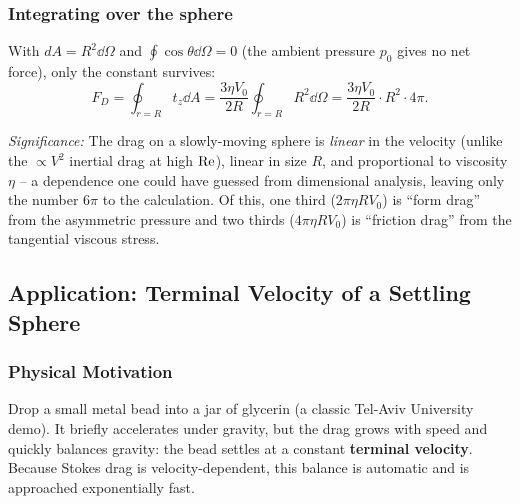 \documentclass[../main.tex]{subfiles}
\begin{document}
\subsubsection*{Integrating over the sphere}
With $dA=R^2\dd{\Omega}$ and $\oint\cos\theta\dd{\Omega}=0$ (the ambient pressure $p_0$ gives no net force), only the constant survives:
\begin{equation}
  F_D=\oint_{r=R}t_z\dd{A}=\frac{3\eta V_0}{2R}\oint_{r=R}R^2\dd{\Omega}
     =\frac{3\eta V_0}{2R}\cdot R^2\cdot 4\pi .
  \label{eq:lec21_Fd_int}
\end{equation}

\textit{Significance:} The drag on a slowly-moving sphere is \emph{linear} in the velocity (unlike the $\propto V^2$ inertial drag at high $\mathrm{Re}$), linear in size $R$, and proportional to viscosity $\eta$ -- a dependence one could have guessed from dimensional analysis, leaving only the number $6\pi$ to the calculation. Of this, one third ($2\pi\eta RV_0$) is ``form drag'' from the asymmetric pressure and two thirds ($4\pi\eta RV_0$) is ``friction drag'' from the tangential viscous stress.


\subsection{Application: Terminal Velocity of a Settling Sphere}\label{sec:lec21:terminal}

\subsubsection*{Physical Motivation}
Drop a small metal bead into a jar of glycerin (a classic Tel-Aviv University demo). It briefly accelerates under gravity, but the drag grows with speed and quickly balances gravity: the bead settles at a constant \textbf{terminal velocity}. Because Stokes drag is velocity-dependent, this balance is automatic and is approached exponentially fast.
\end{document}
